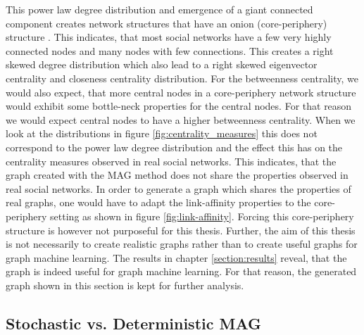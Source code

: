   \noindent This power law degree distribution and emergence of a giant
  connected component creates network structures that have an onion
  (core-periphery) structure \citep[p. 121]{kim2012multiplicative}. This
  indicates, that most social networks have a few very highly connected nodes
  and many nodes with few connections. This creates a right skewed degree 
  distribution which also lead to a right skewed eigenvector centrality and
  closeness centrality distribution. For the betweenness centrality, we would
  also expect, that more central nodes in a core-periphery network structure
  would exhibit some bottle-neck properties for the central nodes. For that
  reason we would expect central nodes to have a higher betweenness centrality.
  When we look at the distributions in figure \ref{fig:centrality_measures}
  this does not correspond to the power law degree distribution and the effect
  this has on the centrality measures observed in real social networks. This
  indicates, that the graph created with the MAG method does not share the
  properties observed in real social networks. In order to generate a graph which
  shares the properties of real graphs, one would have to adapt the 
  link-affinity properties to the core-periphery setting as shown in figure
  \ref{fig:link-affinity}. Forcing this core-periphery structure is however not
  purposeful for this thesis. Further, the aim of this thesis is not
  necessarily to create realistic graphs rather than to create useful graphs 
  for graph machine learning. The results in chapter \ref{section:results}
  reveal, that the graph is indeed useful for graph machine learning. For that
  reason, the generated graph shown in this section is kept for further
  analysis. 

  \subsection{Stochastic vs. Deterministic MAG}
  \label{section:stoch_det}

